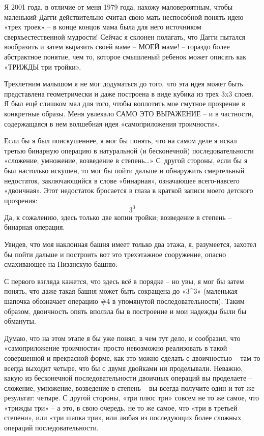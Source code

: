 \documentclass[../main.tex]{subfiles}
\begin{document}
Я 2001 года, в отличие от меня 1979 года, нахожу маловероятным, чтобы маленький Дагги действительно считал свою мать неспособной понять идею «трех троек» \--- в конце концов мама была для него источником сверхъестественной мудрости! Сейчас я склонен полагать, что Дагги пытался вообразить и затем выразить своей маме \--- МОЕЙ маме! \--- гораздо более абстрактное понятие, чем то, которое смышленый ребенок может описать как «ТРИЖДЫ три тройки».

Трехлетним малышом я не мог додуматься до того, что эта идея может быть представлена геометрически и даже построена в виде кубика из трех 3x3 слоев. Я был ещё слишком мал для того, чтобы воплотить мое смутное прозрение в конкретные образы. Меня увлекало САМО ЭТО ВЫРАЖЕНИЕ \--- и в частности, содержащаяся в нем волшебная идея «самоприложения троичности».

Если бы я был поискушеннее, я мог бы понять, что на самом деле я искал третью бинарную операцию в натуральной (и бесконечной) последовательности «сложение, умножение, возведение в степень\ldots» С~другой стороны, если бы я был настолько искушен, то мог бы пойти дальше и обнаружить смертельный недостаток, заключающийся в слове «бинарная», означающее всего-навсего «двоичная». Этот недостаток бросается в глаза в краткой записи моего детского прозрения:
\[
    3^3
\]
Да, к сожалению, здесь только две копии тройки; возведение в степень \--- бинарная операция.

Увидев, что моя наклонная башня имеет только два этажа, я, разумеется, захотел бы пойти дальше и построить вот это трехэтажное сооружение, опасно смахивающее на Пизанскую башню.

С первого взгляда кажется, что здесь всё в порядке \--- но увы, я мог бы затем понять, что даже такая башня может быть сокращена до «$3 \text{\textasciicircum} 3$» (маленькая шапочка обозначает операцию \#4 в упомянутой последовательности). Таким образом, двоичность опять вползла бы в построение и мои надежды были бы обмануты.

Думаю, что на этом этапе я бы уже понял, в чем тут дело, и сообразил, что «самоприложение троичности» просто невозможно реализовать в такой совершенной и прекрасной форме, как это можно сделать с двоичностью \--- там-то всегда выходит четыре, что бы с двумя двойками ни проделывали. Неважно, какую из бесконечной последовательности двоичных операций вы проделаете \--- сложение, умножение, возведение в степень \--- вы всегда получите один и тот же результат: четыре. С другой стороны, «три плюс три» совсем не то же самое, что «трижды три» \--- а это, в свою очередь, не то же самое, что «три в третьей степени», или «три шапка три», или любая из последующих более сложных операций последовательности.
\end{document}
